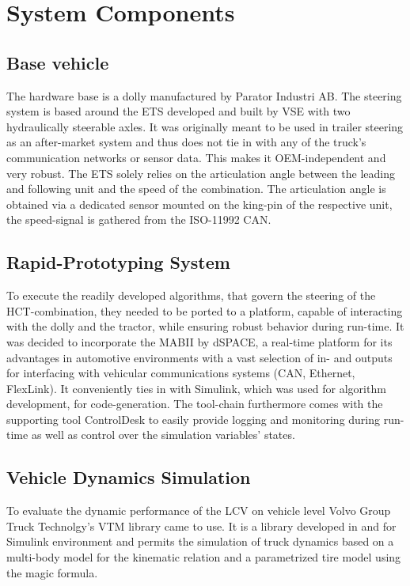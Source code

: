 \documentclass[root.tex]{subfiles}
\begin{document}
{\pagestyle{empty}}
\section{System Components}
\label{chap:Hardware-Setup}
\subsection{Base vehicle}
\label{sec:basevehicle}

The hardware base is a dolly manufactured by Parator Industri AB\cite{paratorAB}. The steering system is based around the \gls{ETS} developed and built by \gls{VSE}\cite{vse} with two hydraulically steerable axles. It was originally meant to be used in trailer steering as an after-market system and thus does not tie in with any of the truck's communication networks or sensor data. This makes it OEM-independent and very robust. The \gls{ETS} solely relies on the articulation angle between the leading and following unit and the speed of the combination. The articulation angle is obtained via a dedicated sensor mounted on the king-pin of the respective unit, the speed-signal is gathered from the ISO-11992 \gls{CAN}. 

\subsection{Rapid-Prototyping System}

To execute the readily developed algorithms, that govern the steering of the \gls{HCT}-combination, they needed to be ported to a platform, capable of interacting with the dolly and the tractor, while ensuring robust behavior during run-time. It was decided to incorporate the \gls{MABII}\cite{mabii} by dSPACE\cite{dspace}, a real-time platform for its advantages in automotive environments with a vast selection of in- and outputs for interfacing with vehicular communications systems (\gls{CAN}, Ethernet, FlexLink). It conveniently ties in with Simulink, which was used for algorithm development, for code-generation. %
 The tool-chain furthermore comes with the supporting tool ControlDesk to easily provide logging and monitoring during run-time as well as control over the simulation variables' states.


\subsection{Vehicle Dynamics Simulation}
To evaluate the dynamic performance of the \gls{LCV} on vehicle level Volvo Group Truck Technolgy's\cite{volvogtt} \gls{VTM} library came to use. It is a library developed in and for Simulink environment and permits the simulation of truck dynamics based on a multi-body model for the kinematic relation and a parametrized tire model using the magic formula.
\end{document}
